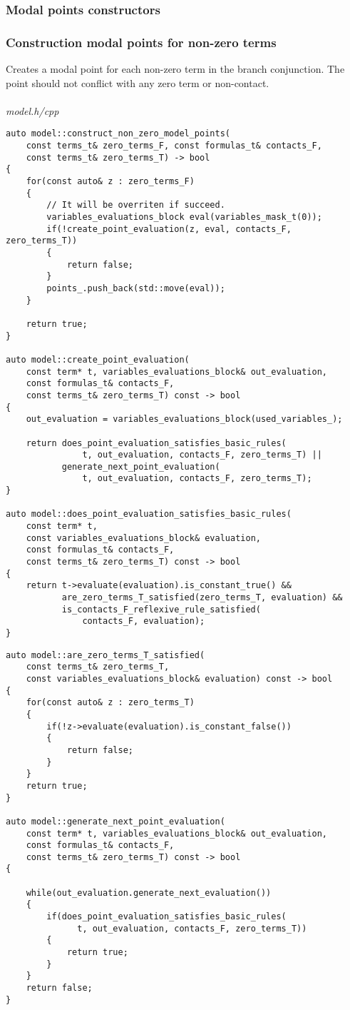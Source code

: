 \documentclass{article}
\begin{document}
	\newpage
	\subsubsection*{Modal points constructors}
	\subsubsection*{Construction modal points for non-zero terms}
	Creates a modal point for each non-zero term in the branch conjunction. The point should not conflict with any zero term or non-contact.
\\
\\
\noindent
\textit{model.h/cpp}
\begin{lstlisting}
auto model::construct_non_zero_model_points(
	const terms_t& zero_terms_F, const formulas_t& contacts_F,
	const terms_t& zero_terms_T) -> bool
{
    for(const auto& z : zero_terms_F)
    {
        // It will be overriten if succeed.
        variables_evaluations_block eval(variables_mask_t(0));
        if(!create_point_evaluation(z, eval, contacts_F, zero_terms_T))
        {
            return false;
        }
        points_.push_back(std::move(eval));
    }

    return true;
}

auto model::create_point_evaluation(
	const term* t, variables_evaluations_block& out_evaluation,
	const formulas_t& contacts_F,
	const terms_t& zero_terms_T) const -> bool
{
    out_evaluation = variables_evaluations_block(used_variables_);

    return does_point_evaluation_satisfies_basic_rules(
               t, out_evaluation, contacts_F, zero_terms_T) ||
           generate_next_point_evaluation(
               t, out_evaluation, contacts_F, zero_terms_T);
}

auto model::does_point_evaluation_satisfies_basic_rules(
	const term* t,
	const variables_evaluations_block& evaluation,
	const formulas_t& contacts_F,
	const terms_t& zero_terms_T) const -> bool
{
    return t->evaluate(evaluation).is_constant_true() &&
           are_zero_terms_T_satisfied(zero_terms_T, evaluation) &&
           is_contacts_F_reflexive_rule_satisfied(
               contacts_F, evaluation);
}
\end{lstlisting}
\newpage
\begin{lstlisting}
auto model::are_zero_terms_T_satisfied(
	const terms_t& zero_terms_T,
	const variables_evaluations_block& evaluation) const -> bool
{
    for(const auto& z : zero_terms_T)
    {
        if(!z->evaluate(evaluation).is_constant_false())
        {
            return false;
        }
    }
    return true;
}

auto model::generate_next_point_evaluation(
	const term* t, variables_evaluations_block& out_evaluation,
	const formulas_t& contacts_F,
	const terms_t& zero_terms_T) const -> bool
{

    while(out_evaluation.generate_next_evaluation())
    {
        if(does_point_evaluation_satisfies_basic_rules(
              t, out_evaluation, contacts_F, zero_terms_T))
        {
            return true;
        }
    }
    return false;
}
\end{lstlisting}
\end{document}
